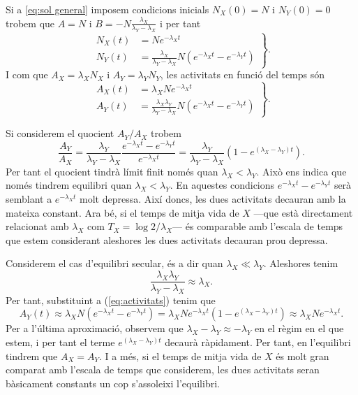 \documentclass[12pt]{article}
\begin{document}
Si a \ref{eq:sol general} imposem condicions inicials \( N_X(0) = N \) i \( N_Y(0) = 0 \) trobem que \( A = N \) i \( B = -N\frac{\lambda_X}{\lambda_Y - \lambda_X} \) i per tant 
\begin{equation*}
	\left.
		\begin{aligned}
			N_X(t) &= Ne^{-\lambda_X t} \\
			N_Y(t) &= \frac{\lambda_X}{\lambda_Y - \lambda_X}N \left(e^{-\lambda_X t} - e^{-\lambda_Y t}\right)
		\end{aligned}
	\right\}.
\end{equation*}
I com que \( A_X = \lambda_X N_X \) i \( A_Y = \lambda_Y N_Y \), les activitats en funció del temps són
\begin{equation} \label{eq:activitats}
	\left.
		\begin{aligned}
			A_X(t) &= \lambda_XNe^{-\lambda_X t} \\
			A_Y(t) &= \frac{\lambda_X \lambda_Y}{\lambda_Y - \lambda_X}N \left(e^{-\lambda_X t} - e^{-\lambda_Y t}\right)
		\end{aligned}
	\right\}.
\end{equation}

Si considerem el quocient \( A_Y / A_X \) trobem
\begin{equation*}
	\frac{A_Y}{A_X} = \frac{\lambda_Y}{\lambda_Y - \lambda_X} \frac{e^{-\lambda_X t} - e^{-\lambda_Y t}}{e^{-\lambda_X t}} = \frac{\lambda_Y}{\lambda_Y - \lambda_X} \left(1 - e^{(\lambda_X - \lambda_Y) t}\right).
\end{equation*}
Per tant el quocient tindrà límit finit només quan \( \lambda_X < \lambda_Y \). Això ens indica que només tindrem equilibri quan \( \lambda_X < \lambda_Y \). En aquestes condicions \( e^{-\lambda_X t} - e^{-\lambda_Y t} \) serà semblant a \( e^{-\lambda_X t}  \) molt depressa. Així doncs, les dues activitats decauran amb la mateixa constant. Ara bé, si el temps de mitja vida de \( X \) ---que està directament relacionat amb \( \lambda_X \) com \( T_X = \log{2}/\lambda_X \)--- és comparable amb l'escala de temps que estem considerant aleshores les dues activitats decauran prou depressa.  

Considerem el cas d'equilibri secular, és a dir quan \( \lambda_X \ll \lambda_Y \). Aleshores tenim 
\begin{equation*}
	\frac{\lambda_X \lambda_Y}{\lambda_Y - \lambda_X} \approx \lambda_X.
\end{equation*}
Per tant, substituint a (\ref{eq:activitats}) tenim que 
\begin{equation*}
	A_Y(t) \approx \lambda_X N \left(e^{-\lambda_X t} - e^{-\lambda_Y t}\right) = \lambda_X N e^{-\lambda_X t} \left(1 - e^{(\lambda_X -\lambda_Y) t}\right) \approx \lambda_X N e^{-\lambda_X t}.
\end{equation*}
Per a l'última aproximació, observem que \( \lambda_X - \lambda_Y \approx -\lambda_Y \) en el règim en el que estem, i per tant el terme \( e^{(\lambda_X - \lambda_Y) t} \) decaurà ràpidament. Per tant, en l'equilibri tindrem que \( A_X = A_Y \). I a més, si el temps de mitja vida de \( X \) és molt gran comparat amb l'escala de temps que considerem, les dues activitats seran bàsicament constants un cop s'assoleixi l'equilibri.
\end{document}
